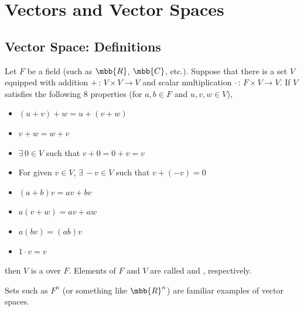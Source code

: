 \documentclass[a4paper, 10pt]{article}
\begin{document}
\section{Vectors and Vector Spaces}

\subsection{Vector Space: Definitions}

\begin{definition}
    Let $F$ be a field (such as $\mbb{R}$, $\mbb{C}$, etc.). Suppose that there is a set $V$ equipped with addition $+ \,:\, V \times V \rightarrow V$ and scalar multiplication $\cdot \,:\, F \times V \rightarrow V$. If $V$ satisfies the following 8 properties (for $a, b \in F$ and $u, v, w \in V$),
    \begin{itemize}
        \item[(1)] $(u + v) + w = u + (v + w)$
        \item[(2)] $v + w = w + v$
        \item[(3)] $\exists \, 0 \in V$ such that $v + 0 = 0 + v = v$
        \item[(4)] For given $v \in V$, $\exists \, -v \in V$ such that $v + (-v) = 0$
        \item[(5)] $(a + b)v = av + bv$
        \item[(6)] $a(v + w) = av + aw$
        \item[(7)] $a(bv) = (ab)v$
        \item[(8)] $1 \cdot v = v$
    \end{itemize}
    then $V$ is a  over $F$. Elements of $F$ and $V$ are called  and , respectively.
\end{definition}

Sets such as $F^{n}$ (or something like $\mbb{R}^{n}$) are familiar examples of vector spaces.

\seprule
\end{document}
